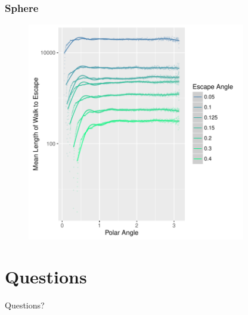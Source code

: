 \documentclass{beamer}
\begin{document}

\begin{frame}
	
	\frametitle{Sphere}
	
	\begin{figure}
		\includegraphics[width=0.85\textwidth]{images/SummaryPlot_L005_04.pdf}
	\end{figure}
	
\end{frame}

\section{Questions}

\begin{frame}
	
	\Huge{\centerline{Questions?}}
	
\end{frame}
\end{document}
